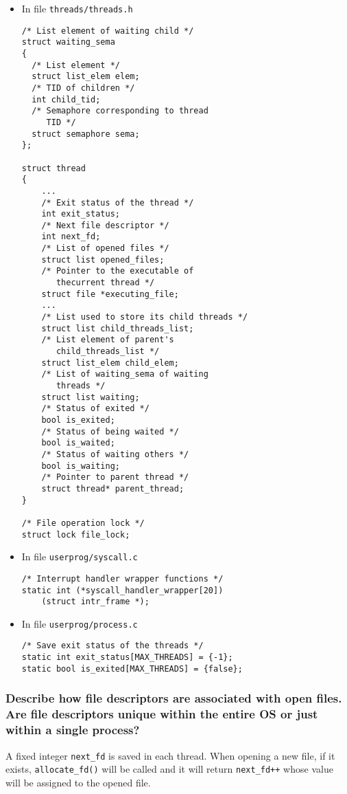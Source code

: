 \documentclass[sigconf, nonacm, balance=false, urlbreakonhyphens=true]{acmart}
\begin{document}
                \begin{itemize}
                    \item In file \texttt{threads/threads.h}
\begin{verbatim}
/* List element of waiting child */
struct waiting_sema
{
  /* List element */
  struct list_elem elem;
  /* TID of children */
  int child_tid;
  /* Semaphore corresponding to thread
     TID */
  struct semaphore sema;
};

struct thread
{
    ...
    /* Exit status of the thread */
    int exit_status;
    /* Next file descriptor */
    int next_fd;
    /* List of opened files */
    struct list opened_files;
    /* Pointer to the executable of 
       thecurrent thread */
    struct file *executing_file;        
    ...
    /* List used to store its child threads */
    struct list child_threads_list;
    /* List element of parent's 
       child_threads_list */
    struct list_elem child_elem;
    /* List of waiting_sema of waiting 
       threads */
    struct list waiting;
    /* Status of exited */
    bool is_exited;
    /* Status of being waited */
    bool is_waited;
    /* Status of waiting others */
    bool is_waiting;
    /* Pointer to parent thread */
    struct thread* parent_thread;
}

/* File operation lock */
struct lock file_lock;
\end{verbatim}
                    \item In file \texttt{userprog/syscall.c}
\begin{verbatim}
/* Interrupt handler wrapper functions */
static int (*syscall_handler_wrapper[20]) 
    (struct intr_frame *);
\end{verbatim}
                    \item In file \texttt{userprog/process.c}
\begin{verbatim}
/* Save exit status of the threads */
static int exit_status[MAX_THREADS] = {-1};
static bool is_exited[MAX_THREADS] = {false};
\end{verbatim}
                \end{itemize}

            \subsubsection{Describe how file descriptors are associated with open files.  Are file descriptors unique within the entire OS or just within a single process? }

            A fixed integer \texttt{next\_fd} is saved in each thread. When opening a new file, if it exists, \texttt{allocate\_fd()} will be called and it will return \texttt{next\_fd++} whose value will be assigned to the opened file. 
\end{document}
